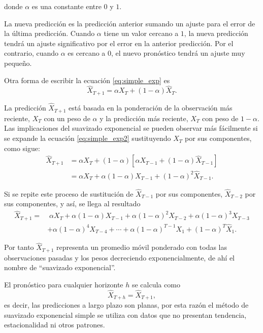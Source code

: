 \documentclass[12pt,twoside]{article}
\begin{document}
donde $\alpha$ es una constante entre $0$ y $1$.

La nueva predicción es la predicción anterior sumando un ajuste para el error de la última predicción. Cuando $\alpha$ tiene un valor cercano a $1$, la nueva predicción tendrá un ajuste significativo por el error en la anterior predicción. Por el contrario, cuando $\alpha$ es cercano a $0$, el nuevo pronóstico tendrá un ajuste muy pequeño.

Otra forma de escribir la ecuación \eqref{eq:simple_exp} es
\begin{equation} \label{eq:simple_exp2}
    \hat{X}_{T+1} = \alpha X_T + (1-\alpha)\hat{X}_T. 
\end{equation}

La predicción $\hat{X}_{T+1}$ está basada en la ponderación de la observación más reciente, $X_T$ con un peso de $\alpha$ y la predicción más reciente, $\hat{X}_T$ con peso de $1-\alpha$. Las implicaciones del suavizado exponencial se pueden observar más fácilmente si se expande la ecuación \eqref{eq:simple_exp2} sustituyendo $\hat{X}_T$ por sus componentes, como sigue:
\begin{equation*}
\begin{split}
\hat{X}_{T+1} & =  \alpha X_T + (1-\alpha) [\alpha X_{T-1} + (1-\alpha)\hat{X}_{T-1}] \\
& = \alpha X_T + \alpha(1-\alpha)X_{T-1} + (1-\alpha)^2\hat{X}_{T-1}.
\end{split}
\end{equation*}

Si se repite este proceso de sustitución de $\hat{X}_{T-1}$ por sus componentes, $\hat{X}_{T-2}$ por sus componentes, y así, se llega al resultado
\begin{equation*}
\begin{split}
    \hat{X}_{T+1} = &\; \alpha X_T + \alpha(1-\alpha)X_{T-1} + \alpha(1-\alpha)^2X_{T-2} + \alpha(1-\alpha)^3X_{T-3} \\
    & + \alpha(1-\alpha)^4X_{T-4} + \dotsb +  \alpha(1-\alpha)^{T-1}X_1 + (1-\alpha)^T\hat{X}_1.
\end{split}
\end{equation*}

Por tanto $\hat{X}_{T+1}$ representa un promedio móvil ponderado con todas las observaciones pasadas y los pesos decreciendo exponencialmente, de ahí el nombre de ``suavizado exponencial''.

El pronóstico para cualquier horizonte $h$ se calcula como
\begin{equation}
    \hat{X}_{T+h} = \hat{X}_{T+1},
\end{equation}
es decir, las predicciones a largo plazo son planas, por esta razón el método de suavizado exponencial simple se utiliza con datos que no presentan tendencia, estacionalidad ni otros patrones.
\end{document}
